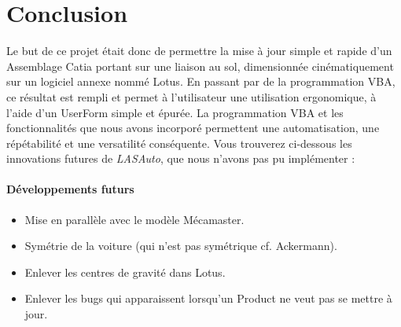 \section{Conclusion}


Le but de ce projet était donc de permettre la mise à jour simple et rapide d'un Assemblage Catia portant sur une liaison au sol, dimensionnée cinématiquement sur un logiciel annexe nommé Lotus.
En passant par de la programmation VBA, ce résultat est rempli et permet à l'utilisateur une utilisation ergonomique, à l'aide d'un UserForm simple et épurée.
La programmation VBA et les fonctionnalités que nous avons incorporé permettent une automatisation, une répétabilité et une versatilité conséquente.
Vous trouverez ci-dessous les innovations futures de \textit{LASAuto}, que nous n'avons pas pu implémenter :

\paragraph{Développements futurs}
\begin{itemize}
    \item Mise en parallèle avec le modèle Mécamaster.
    \item Symétrie de la voiture (qui n'est pas symétrique cf. Ackermann).
    \item Enlever les centres de gravité dans Lotus.
    \item Enlever les bugs qui apparaissent lorsqu'un Product ne veut pas se mettre à jour.
\end{itemize}


